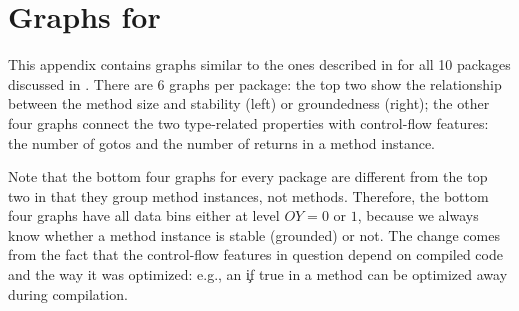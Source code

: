 
\appendix

\chapter{Graphs for }\label{sec:app}

This appendix contains graphs similar to the ones described in
 for all 10 packages discussed in .
There are 6 graphs per package: the top two show the relationship between the
method size and stability (left) or groundedness (right); the other four graphs
connect the two type-related properties with control-flow features: the number
of gotos and the number of returns in a method instance.

Note that the bottom four graphs for every package are different from the top
two in that they group method instances, not methods. Therefore,
the bottom four graphs have all data bins either at level $OY=0$ or $1$, because
we always know whether a method instance is stable (grounded) or not.
The change comes from the fact that the control-flow features in question
depend on compiled code and the way it was optimized: e.\;g., an \c{if true} in a
method can be optimized away during compilation.

\clearpage

% 
